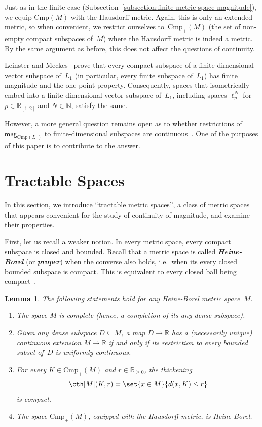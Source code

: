 \documentclass[11pt]{article}
\theoremstyle{plain}
\newtheorem{lemma}[theorem]{Lemma}
\theoremstyle{definition}
\newcommand{\df}[1]{\emph{\textbf{#1}}}  %
\newcommand{\NN}{\mathbb{N}}
\newcommand{\RR}{\mathbb{R}}
\newcommand{\intcc}[3][\RR]{{#1}_{[#2, #3]}}
\newcommand{\mg}[1][]{\mathsf{mag}_{#1}}
\newcommand{\csub}{\mathrm{Cmp}}
\newcommand{\icsub}{\csub_{+}}
\begin{document}
Just as in the finite case (Subsection~\ref{subsection:finite-metric-space-magnitude}), we equip $\csub(M)$ with the Hausdorff metric. Again, this is only an extended metric, so when convenient, we restrict ourselves to~$\icsub(M)$ (the set of non-empty compact subspaces of~$M$) where the Hausdorff metric is indeed a metric. By the same argument as before, this does not affect the questions of continuity.

Leinster and Meckes~\cite[Theorem~3.1]{leinster2023spaces} prove that every compact subspace of a finite-dimensional vector subspace of~$L_1$ (in particular, every finite subspace of~$L_1$) has finite magnitude and the one-point property. Consequently, spaces that isometrically embed into a finite-dimensional vector subspace of~$L_1$, including spaces $\ell_p^N$ for $p \in \intcc{1}{2}$ and $N \in \NN$, satisfy the same. 

However, a more general question remains open as to whether restrictions of $\mg[\csub(L_1)]$ to finite-dimensional subspaces are continuous~\cite[Conjecture~1.3]{katsumasa2025magnitudegenericallycontinuousfinite}. One of the purposes of this paper is to contribute to the answer.


\section{Tractable Spaces}\label{section:tractable_spaces}

In this section, we introduce ``tractable metric spaces'', a class of metric spaces that appears convenient for the study of continuity of magnitude, and examine their properties.

First, let us recall a weaker notion. In every metric space, every compact subspace is closed and bounded. Recall that a metric space is called \df{Heine-Borel} (or \df{proper}) when the converse also holds, i.e.\ when its every closed bounded subspace is compact. This is equivalent to every closed ball being compact~\cite[1 Definitions, Chapter H]{Petrunin2023}.

\begin{lemma}\label{lemma:heine-borel-spaces}
The following statements hold for any Heine-Borel metric space~$M$.
\begin{enumerate}
\item
The space $M$ is complete (hence, a completion of its any dense subspace).
\item
Given any dense subspace $D \subseteq M$, a map $D \to \RR$ has a (necessarily unique) continuous extension $M \to \RR$ if and only if its restriction to every bounded subset of~$D$ is uniformly continuous.
\item
For every $K \in \icsub(M)$ and $r \in \RR_{\geq 0}$, the thickening 
\[\cth[M](K, r) = \set{x \in M}{d(x, K) \leq r}\]
is compact.
\item
The space $\icsub(M)$, equipped with the Hausdorff metric, is Heine-Borel.
\end{enumerate}
\end{lemma}
\end{document}
